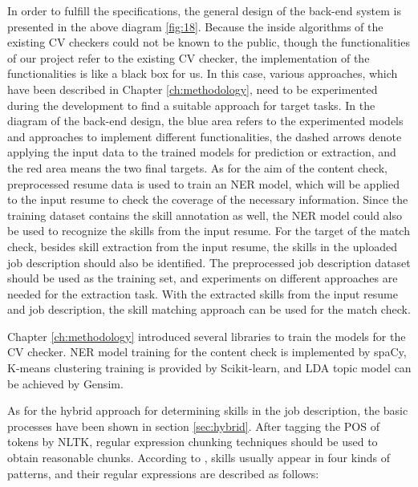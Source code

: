 In order to fulfill the specifications, the general design of the back-end system is presented in the above diagram \ref{fig:18}. Because the inside algorithms of the existing CV checkers could not be known to the public, though the functionalities of our project refer to the existing CV checker, the implementation of the functionalities is like a black box for us. In this case, various approaches, which have been described in Chapter \ref{ch:methodology}, need to be experimented during the development to find a suitable approach for target tasks. In the diagram of the back-end design, the blue area refers to the experimented models and approaches to implement different functionalities, the dashed arrows denote applying the input data to the trained models for prediction or extraction, and the red area means the two final targets. As for the aim of the content check, preprocessed resume data is used to train an NER model, which will be applied to the input resume to check the coverage of the necessary information. Since the training dataset contains the skill annotation as well, the NER model could also be used to recognize the skills from the input resume. For the target of the match check, besides skill extraction from the input resume, the skills in the uploaded job description should also be identified. The preprocessed job description dataset should be used as the training set, and experiments on different approaches are needed for the extraction task. With the extracted skills from the input resume and job description, the skill matching approach can be used for the match check.

Chapter \ref{ch:methodology} introduced several libraries to train the models for the CV checker. NER model training for the content check is implemented by spaCy, K-means clustering training is provided by Scikit-learn, and LDA topic model can be achieved by Gensim. 

As for the hybrid approach for determining skills in the job description, the basic processes have been shown in section \ref{sec:hybrid}. After tagging the POS of tokens by NLTK, regular expression chunking techniques should be used to obtain reasonable chunks. According to \cite{ketterer}, skills usually appear in four kinds of patterns, and their regular expressions are described as follows:

